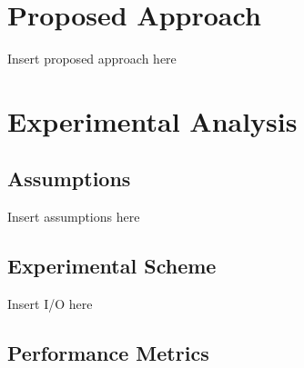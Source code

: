 \documentclass[conference]{IEEEtran}
\begin{document}

\section{Proposed Approach}

Insert proposed approach here


\section{Experimental Analysis}


\subsection{Assumptions}

Insert assumptions here


\subsection{Experimental Scheme}

Insert I/O here


\subsection{Performance Metrics}
\end{document}
